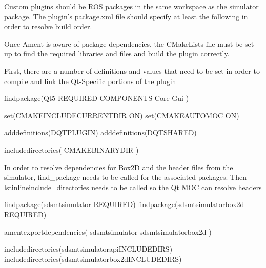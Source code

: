 \documentclass[letterpaper,10pt,english]{sphinxmanual}
\begin{document}

Custom plugins should be ROS packages in the same workspace as the simulator package. The plugin’s package.xml file should specify at least the following in order
to resolve build order.

%
\begin{sphinxVerbatim}[commandchars=\\\{\}]
\end{sphinxVerbatim}

Once Ament is aware of package dependencies, the CMakeLists file must be set up to find the required libraries and files and build the plugin correctly.

First, there are a number of definitions and values that need to be set in order to compile and link the Qt-Specific portions of the plugin

%
\begin{sphinxVerbatim}[commandchars=\\\{\}]
find\PYGZus{}package(Qt5 REQUIRED COMPONENTS
Core Gui
)

set(CMAKE\PYGZus{}INCLUDE\PYGZus{}CURRENT\PYGZus{}DIR ON)
set(CMAKE\PYGZus{}AUTOMOC ON)

add\PYGZus{}definitions(\PYGZhy{}DQT\PYGZus{}PLUGIN)
add\PYGZus{}definitions(\PYGZhy{}DQT\PYGZus{}SHARED)

include\PYGZus{}directories( \PYGZdl{}\PYGZob{}CMAKE\PYGZus{}BINARY\PYGZus{}DIR\PYGZcb{} )
\end{sphinxVerbatim}

In order to resolve dependencies for Box2D and the header files from the simulator, find\_package needs to be called for the associated packages. Then lstinline\textbar{}include\_directories\textbar{} needs to be called so the Qt MOC can resolve headers

%
\begin{sphinxVerbatim}[commandchars=\\\{\}]
find\PYGZus{}package(sdsmt\PYGZus{}simulator REQUIRED)
find\PYGZus{}package(sdsmt\PYGZus{}simulator\PYGZus{}box2d REQUIRED)

ament\PYGZus{}export\PYGZus{}dependencies(
        sdsmt\PYGZus{}simulator
        sdsmt\PYGZus{}simulator\PYGZus{}box2d
)

include\PYGZus{}directories(\PYGZdl{}\PYGZob{}sdsmt\PYGZus{}simulator\PYGZus{}api\PYGZus{}INCLUDE\PYGZus{}DIRS\PYGZcb{})
include\PYGZus{}directories(\PYGZdl{}\PYGZob{}sdsmt\PYGZus{}simulator\PYGZus{}box2d\PYGZus{}INCLUDE\PYGZus{}DIRS\PYGZcb{})
\end{sphinxVerbatim}
\end{document}
